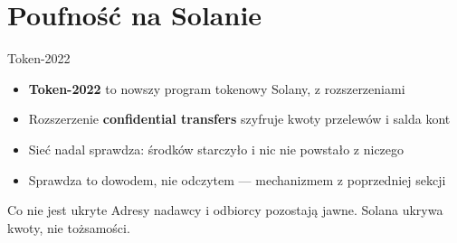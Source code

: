 \section{Poufność na Solanie}

\begin{frame}{Token-2022}
  \begin{itemize}
    \item \textbf{Token-2022} to nowszy program tokenowy Solany, z rozszerzeniami
    \item Rozszerzenie \textbf{confidential transfers} szyfruje kwoty przelewów i salda kont
    \item Sieć nadal sprawdza: środków starczyło i nic nie powstało z niczego
    \item Sprawdza to dowodem, nie odczytem --- mechanizmem z poprzedniej sekcji
  \end{itemize}
  \vspace{0.25cm}
  \begin{alertblock}{Co nie jest ukryte}
    Adresy nadawcy i odbiorcy pozostają jawne.
    Solana ukrywa kwoty, nie tożsamości.
  \end{alertblock}
\end{frame}

